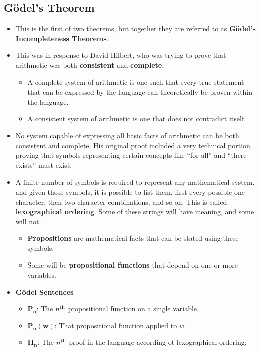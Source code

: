 \documentclass{article}
\begin{document}
\subsection*{Gödel's Theorem}
\begin{itemize}
    \item This is the first of two theorems, but together they are referred to as \textbf{Gödel's Incompleteness Theorems}.
    \item This was in response to David Hilbert, who was trying to prove that arithmetic was both \textbf{consistent} and \textbf{complete}.
    \begin{itemize}
        \item A complete system of arithmetic is one such that every true statement that can be expressed by the language can theoretically be proven within the language.
        \item A consistent system of arithmetic is one that does not contradict itself.
    \end{itemize}
    \item No system capable of expressing all basic facts of arithmetic can be both consistent and complete. His original proof included a very technical portion proving that symbols representing certain concepts like ``for all'' and ``there exists'' must exist.
    \item A finite number of symbols is required to represent any mathematical system, and given those symbols, it is possible to list them, first every possible one character, then two character combinations, and so on. This is called \textbf{lexographical ordering}. Some of these strings will have meaning, and some will not.
    \begin{itemize}
        \item \textbf{Propositions} are mathematical facts that can be stated using these symbols.
        \item Some will be \textbf{propositional functions} that depend on one or more variables.
    \end{itemize}
    \item \textbf{Gödel Sentences}
    \begin{itemize}
        \item \(\bm{P_n}\): The \(n^{\textnormal{th}}\) propositional function on a single variable.
        \item \(\bm{P_n(w)}\): That propositional function applied to \(w\).
        \item \(\bm{\Pi_n}\): The \(n^{\textnormal{th}}\) proof in the language according ot lexographical ordering.

\end{itemize}
\end{itemize}
\end{document}
